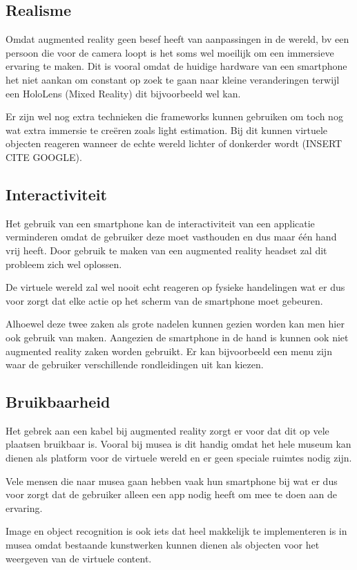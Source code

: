 \subsection{Realisme}
Omdat augmented reality geen besef heeft van aanpassingen in de wereld, bv een persoon die voor de camera loopt is het soms wel moeilijk om een immersieve ervaring te maken. Dit is vooral omdat de huidige hardware van een smartphone het niet aankan om constant op zoek te gaan naar kleine veranderingen terwijl een HoloLens (Mixed Reality) dit bijvoorbeeld wel kan.

Er zijn wel nog extra technieken die frameworks kunnen gebruiken om toch nog wat extra immersie te creëren zoals light estimation. Bij dit kunnen virtuele objecten reageren wanneer de echte wereld lichter of donkerder wordt (INSERT CITE GOOGLE).

\subsection{Interactiviteit}
Het gebruik van een smartphone kan de interactiviteit van een applicatie verminderen omdat de gebruiker deze moet vasthouden en dus maar één hand vrij heeft. Door gebruik te maken van een augmented reality headset zal dit probleem zich wel oplossen.

De virtuele wereld zal wel nooit echt reageren op fysieke handelingen wat er dus voor zorgt dat elke actie op het scherm van de smartphone moet gebeuren.

Alhoewel deze twee zaken als grote nadelen kunnen gezien worden kan men hier ook gebruik van maken. Aangezien de smartphone in de hand is kunnen ook niet augmented reality zaken worden gebruikt. Er kan bijvoorbeeld een menu zijn waar de gebruiker verschillende rondleidingen uit kan kiezen.

\subsection{Bruikbaarheid}
Het gebrek aan een kabel bij augmented reality zorgt er voor dat dit op vele plaatsen bruikbaar is. Vooral bij musea is dit handig omdat het hele museum kan dienen als platform voor de virtuele wereld en er geen speciale ruimtes nodig zijn.

Vele mensen die naar musea gaan hebben vaak hun smartphone bij wat er dus voor zorgt dat de gebruiker alleen een app nodig heeft om mee te doen aan de ervaring.

Image en object recognition is ook iets dat heel makkelijk te implementeren is in musea omdat bestaande kunstwerken kunnen dienen als objecten voor het weergeven van de virtuele content.

